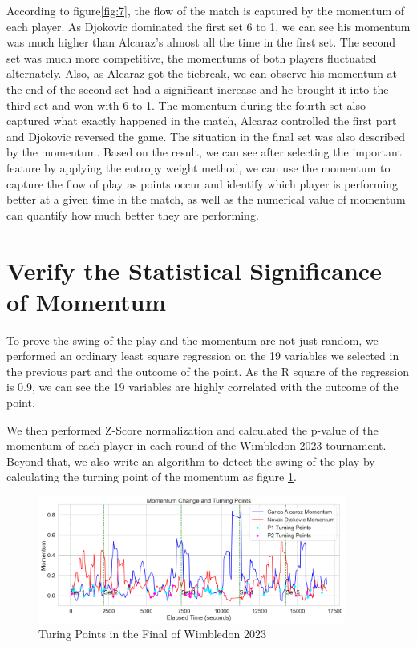 \documentclass[12pt]{article}
\begin{document}
According to figure\ref{fig:7}, the flow of the match is captured by the momentum of each player. As Djokovic 
dominated the first set 6 to 1, we can see his momentum was much higher than Alcaraz's almost all the time in the first set.
The second set was much more competitive, the momentums of both players fluctuated alternately. Also, as Alcaraz got the 
tiebreak, we can observe his momentum at the end of the second set had a significant increase and he brought it into the 
third set and won with 6 to 1. The momentum during the fourth set also captured what exactly happened in the match, Alcaraz
controlled the first part and Djokovic reversed the game. The situation in the final set was also described by the momentum.
Based on the result, we can see after selecting the important feature by applying the entropy weight method, we can use the momentum
to capture the flow of play as points occur and identify which player is performing better at a given time in the match, as well as 
the numerical value of momentum can quantify how much better they are performing.

\section{Verify the Statistical Significance of Momentum}
\quad To prove the swing of the play and the momentum are not just random, we performed an ordinary least square regression on the 19 variables
we selected in the previous part and the outcome of the point. As the R square of the regression is 0.9, we can see the 19 variables are
highly correlated with the outcome of the point.

We then performed Z-Score normalization and calculated the 
p-value of the momentum of each player in each round of the Wimbledon 2023 tournament. Beyond that, we also write an algorithm to
detect the swing of the play by calculating the turning point of the momentum as figure \ref{fig:14}. 

\begin{figure}[h!]
    \centering
    \includegraphics[width=0.9\textwidth]{turning_point.png}
    \caption{Turing Points in the Final of Wimbledon 2023} 
    \label{fig:14}
\end{figure}
\end{document}
